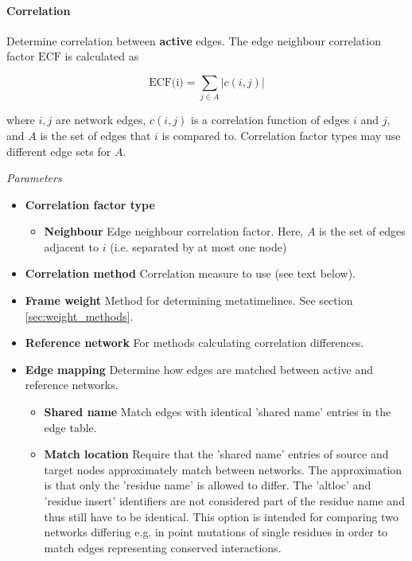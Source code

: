 \paragraph{Correlation}

Determine correlation between \textbf{active} edges. The edge neighbour correlation factor $\textrm{ECF}$ is calculated as

\begin{equation}
  \label{eq:edge_corf}
  \textrm{ECF(i)} = \sum_{j \in A} |c(i,j)|
\end{equation}

where $i,j$ are network edges, $c(i,j)$ is a correlation function of edges $i$ and $j$, and $A$ is the set of edges that $i$ is compared to. Correlation factor types may use different edge sets for $A$.

\textit{Parameters}
\begin{itemize}
\item \textbf{Correlation factor type}
  \begin{itemize}
  \item \textbf{Neighbour} Edge neighbour correlation factor. Here, $A$ is the set of edges adjacent to $i$ (i.e. separated by at most one node)
    \end{itemize}
\item \textbf{Correlation method} Correlation measure to use (see text below).
\item \textbf{Frame weight} Method for determining metatimelines. See section \ref{sec:weight_methods}.
\item \textbf{Reference network} For methods calculating correlation differences.
\item \textbf{Edge mapping} Determine how edges are matched between active and reference networks.
  \begin{itemize}
  \item \textbf{Shared name} Match edges with identical 'shared name' entries in the edge table.
  \item \textbf{Match location} Require that the 'shared name' entries of source and target nodes approximately match between networks. The approximation is that only the 'residue name' is allowed to differ. The 'altloc' and 'residue insert' identifiers are not considered part of the residue name and thus still have to be identical. This option is intended for comparing two networks differing e.g. in point mutations of single residues in order to match edges representing conserved interactions.
  \end{itemize}
\end{itemize}


